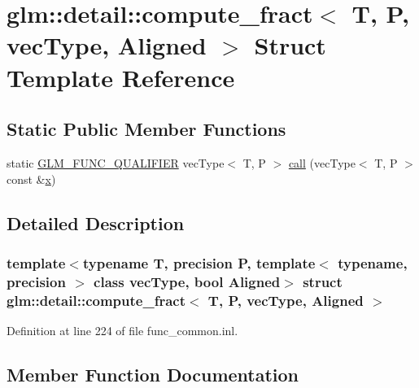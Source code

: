 \hypertarget{structglm_1_1detail_1_1compute__fract}{}\section{glm\+::detail\+::compute\+\_\+fract$<$ T, P, vec\+Type, Aligned $>$ Struct Template Reference}
\label{structglm_1_1detail_1_1compute__fract}
\subsection*{Static Public Member Functions}
\begin{DoxyCompactItemize}
\item 
static \mbox{\hyperlink{setup_8hpp_a33fdea6f91c5f834105f7415e2a64407}{G\+L\+M\+\_\+\+F\+U\+N\+C\+\_\+\+Q\+U\+A\+L\+I\+F\+I\+ER}} vec\+Type$<$ T, P $>$ \mbox{\hyperlink{structglm_1_1detail_1_1compute__fract_a038503e0f1c7ac4e952cdefd055c32dd}{call}} (vec\+Type$<$ T, P $>$ const \&\mbox{\hyperlink{glad_8h_a92d0386e5c19fb81ea88c9f99644ab1d}{x}})
\end{DoxyCompactItemize}


\subsection{Detailed Description}
\subsubsection*{template$<$typename T, precision P, template$<$ typename, precision $>$ class vec\+Type, bool Aligned$>$\newline
struct glm\+::detail\+::compute\+\_\+fract$<$ T, P, vec\+Type, Aligned $>$}



Definition at line 224 of file func\+\_\+common.\+inl.



\subsection{Member Function Documentation}
\mbox{\label{structglm_1_1detail_1_1compute__fract_a038503e0f1c7ac4e952cdefd055c32dd}} 
